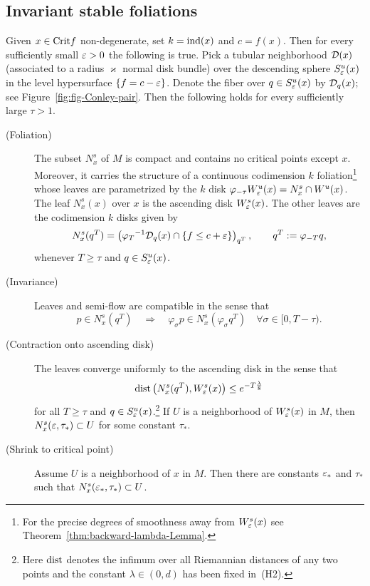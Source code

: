 \documentclass{article}
\begin{document}
\subsection*{Invariant stable foliations}%
\begin{theorem}\label{thm:inv-fol}
Given $x\in{\rm Crit} f$ non-degenerate, set $k={\rm ind}(x)$ and $c=f(x)$. Then
for every sufficiently small ${\varepsilon}>0$ the following is true. Pick a tubular neighborhood
${\mathcal{D}}(x)$ (associated to a radius $\varkappa$ normal disk bundle) over the descending
sphere $S^u_{\varepsilon}(x)$ in the level hypersurface $\{f=c-{\varepsilon}\}$. Denote the fiber
over $q\in S^u_{\varepsilon}(x)$ by ${\mathcal{D}}_q(x)$; see Figure~\ref{fig:fig-Conley-pair}.
Then the following holds for every sufficiently large $\tau>1$.
\begin{description}
\item[(Foliation)]
  The subset $N_x^s$ of $M$ is compact and contains no critical points 
  except $x$. Moreover, it carries the structure of a
  continuous codimension $k$ foliation\footnote{
    For the precise degrees of smoothness away from $W^s_{\varepsilon}(x)$ see
    Theorem~\ref{thm:backward-lambda-Lemma}.
    }
  whose leaves are parametrized by the $k$ disk $\varphi_{-\tau} W^u_{\varepsilon}(x)=N^s_x\cap W^u(x)$.
  The leaf $N_x^s(x)$ over $x$ is the
  ascending disk $W^s_{\varepsilon}(x)$. The other leaves are the codimension $k$ disks given by
  \begin{equation*}
     N_x^s(q^T)
     =\left({\varphi_T}^{-1}{\mathcal{D}}_q (x)\cap
     \{f\le c+{\varepsilon}\}\right)_{q^T}
     ,\qquad
     q^T:=\varphi_{-T}q,
  \end{equation*}
  whenever $T\ge\tau$ and $q\in S^u_{\varepsilon}(x)$.
\item[(Invariance)]
  Leaves and semi-flow are compatible in the sense that
  \begin{equation*}
     p\in N_x^s(q^T)
     \quad\Rightarrow\quad
     \varphi_\sigma p\in N_x^s(\varphi_\sigma q^T)
     \quad \forall \sigma\in[0,T-\tau).
  \end{equation*}
\item[(Contraction onto ascending disk)]
  The leaves converge uniformly to the ascending disk in the sense that
  \begin{equation}\label{eq:unif-exp-dist}
     \dist\left(N_x^s(q^T),W^s_\eps(x)\right)
     \le e^{-T\frac{\lambda}{8}}
  \end{equation}
  for all $T\ge\tau$ and $q\in S^u_{\varepsilon}(x)$.\footnote{
    Here ${\rm dist}$ denotes the infimum over all Riemannian distances of any two points
    and the constant $\lambda\in(0,d)$ has been fixed in~(H2).
    }
  If $U$ is a neighborhood of $W^s_{\varepsilon}(x)$ in $M$, then
  $N_x^s({\varepsilon},\tau_*)\subset U$ for some constant $\tau_*$.
\item[(Shrink to critical point)]
  Assume $U$ is a neighborhood of $x$ in $M$. Then there are constants ${\varepsilon}_*$ and
  $\tau_*$ such that $N_x^s({\varepsilon}_*,\tau_*)\subset U$.
\end{description}
\end{theorem}
\end{document}
